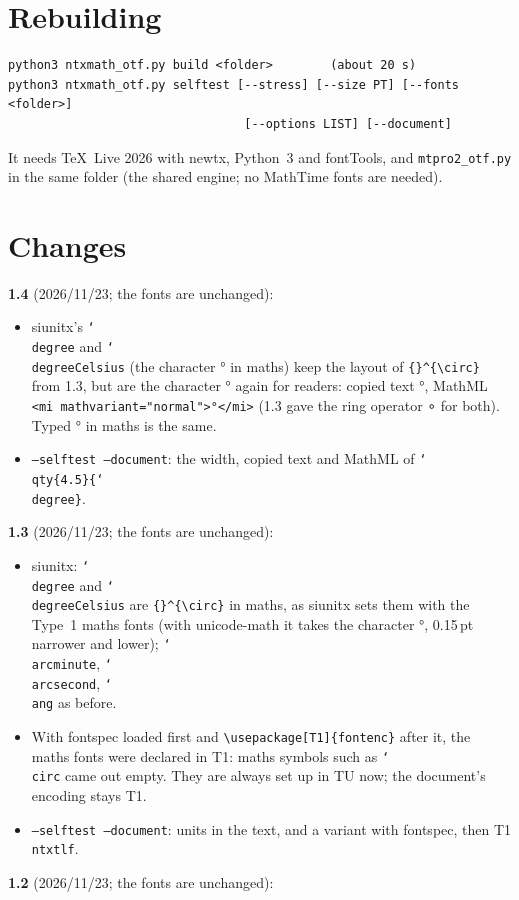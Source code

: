 \documentclass[11pt,a4paper]{article}
\newcommand\cs[1]{\texttt{\char`\\#1}}
\begin{document}
\section{Rebuilding}
\begin{verbatim}
python3 ntxmath_otf.py build <folder>        (about 20 s)
python3 ntxmath_otf.py selftest [--stress] [--size PT] [--fonts <folder>]
                                 [--options LIST] [--document]
\end{verbatim}
It needs \TeX\ Live 2026 with \textsf{newtx}, Python~3 and \textsf{fontTools}, and
\texttt{mtpro2\_otf.py} in the same folder (the shared engine; no MathTime fonts are
needed).

\section{Changes}
\textbf{1.4} (2026/11/23; the fonts are unchanged):
\begin{itemize}
\item \textsf{siunitx}'s \cs{degree} and \cs{degreeCelsius} (the character ° in maths) keep the
  layout of \verb|{}^{\circ}| from 1.3, but are the character ° again for readers: copied text
  °, MathML \verb|<mi mathvariant="normal">°</mi>| (1.3 gave the ring operator ∘ for both).
  Typed ° in maths is the same.
\item \texttt{--selftest --document}: the width, copied text and MathML of
  \cs{qty\{4.5\}\{\cs{degree}\}}.
\end{itemize}
\textbf{1.3} (2026/11/23; the fonts are unchanged):
\begin{itemize}
\item \textsf{siunitx}: \cs{degree} and \cs{degreeCelsius} are \verb|{}^{\circ}| in maths, as
  \textsf{siunitx} sets them with the Type~1 maths fonts (with \textsf{unicode-math} it takes the
  character °, 0.15\,pt narrower and lower); \cs{arcminute}, \cs{arcsecond}, \cs{ang} as before.
\item With \textsf{fontspec} loaded first and \verb|\usepackage[T1]{fontenc}| after it, the maths
  fonts were declared in T1: maths symbols such as \cs{circ} came out empty. They are always set
  up in TU now; the document's encoding stays T1.
\item \texttt{--selftest --document}: units in the text, and a variant with \textsf{fontspec},
  then T1 \texttt{ntxtlf}.
\end{itemize}
\textbf{1.2} (2026/11/23; the fonts are unchanged):
\end{document}
